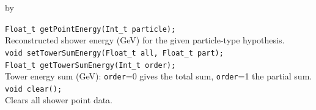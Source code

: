 \documentclass[twoside]{article}
\newcommand{\entrylabel}[1]{\mbox{\textbf{{#1}}}\hfil}%
\newenvironment{entry}
{\begin{list}{}%
    {\renewcommand{\makelabel}{\entrylabel}%
     \setlength{\labelwidth}{90pt}%
     \setlength{\leftmargin}{\labelwidth}
     \advance\leftmargin by \labelsep%
      }%
    }%
  {\end{list}}
\newcommand{\Entrylabel}[1]%
{\raisebox{0pt}[1ex][0pt]{\makebox[\labelwidth][l]%
    {\parbox[t]{\labelwidth}{\hspace{0pt}\textbf{{#1}}}}}}
\newenvironment{Entry}%
{\renewcommand{\entrylabel}{\Entrylabel}\begin{entry}}%
  {\end{entry}}
\begin{document}
\begin{Entry}
    \verb+Float_t getPointEnergy(Int_t particle);+\\
    Reconstructed shower energy (GeV) for the given particle-type hypothesis.\\
    \verb+void setTowerSumEnergy(Float_t all, Float_t part);+\\
    \verb+Float_t getTowerSumEnergy(Int_t order);+\\
    Tower energy sum (GeV): \texttt{order}=0 gives the total sum, \texttt{order}=1 the partial sum.\\
    \verb+void clear();+\\
    Clears all shower point data.\\
\end{Entry}
\clearpage

\end{document}

